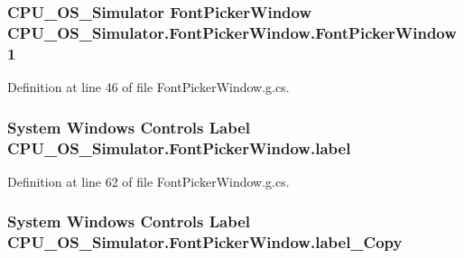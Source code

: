 \subsubsection[{Font\+Picker\+Window1}]{\setlength{\rightskip}{0pt plus 5cm}C\+P\+U\+\_\+\+O\+S\+\_\+\+Simulator {\bf Font\+Picker\+Window} C\+P\+U\+\_\+\+O\+S\+\_\+\+Simulator.\+Font\+Picker\+Window.\+Font\+Picker\+Window1\hspace{0.3cm}{\ttfamily [package]}}\label{class_c_p_u___o_s___simulator_1_1_font_picker_window_afb8444d85c5401e08689ca4ad477703a}


Definition at line 46 of file Font\+Picker\+Window.\+g.\+cs.

\hypertarget{class_c_p_u___o_s___simulator_1_1_font_picker_window_ada73b11773a6ec5fbddb19ee96bb131b}{}
\subsubsection[{label}]{\setlength{\rightskip}{0pt plus 5cm}System Windows Controls Label C\+P\+U\+\_\+\+O\+S\+\_\+\+Simulator.\+Font\+Picker\+Window.\+label\hspace{0.3cm}{\ttfamily [package]}}\label{class_c_p_u___o_s___simulator_1_1_font_picker_window_ada73b11773a6ec5fbddb19ee96bb131b}


Definition at line 62 of file Font\+Picker\+Window.\+g.\+cs.

\hypertarget{class_c_p_u___o_s___simulator_1_1_font_picker_window_a25630ec7b1b5e76da6c7296d267067c9}{}
\subsubsection[{label\+\_\+\+Copy}]{\setlength{\rightskip}{0pt plus 5cm}System Windows Controls Label C\+P\+U\+\_\+\+O\+S\+\_\+\+Simulator.\+Font\+Picker\+Window.\+label\+\_\+\+Copy\hspace{0.3cm}{\ttfamily [package]}}\label{class_c_p_u___o_s___simulator_1_1_font_picker_window_a25630ec7b1b5e76da6c7296d267067c9}


